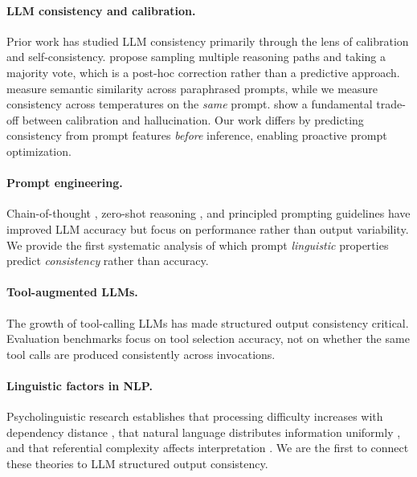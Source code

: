 \documentclass{article}
\begin{document}
\paragraph{LLM consistency and calibration.}
Prior work has studied LLM consistency primarily through the lens of calibration and self-consistency. \citet{wang2023selfconsistency} propose sampling multiple reasoning paths and taking a majority vote, which is a post-hoc correction rather than a predictive approach. \citet{raj2023semantic} measure semantic similarity across paraphrased prompts, while we measure consistency across temperatures on the \emph{same} prompt. \citet{kalai2024calibrated} show a fundamental trade-off between calibration and hallucination. Our work differs by predicting consistency from prompt features \emph{before} inference, enabling proactive prompt optimization.

\paragraph{Prompt engineering.}
Chain-of-thought \citep{wei2022chain}, zero-shot reasoning \citep{kojima2022large}, and principled prompting guidelines \citep{bsharat2024principled} have improved LLM accuracy but focus on performance rather than output variability. We provide the first systematic analysis of which prompt \emph{linguistic} properties predict \emph{consistency} rather than accuracy.

\paragraph{Tool-augmented LLMs.}
The growth of tool-calling LLMs \citep{schick2023toolformer, patil2023gorilla, qin2023toolllm} has made structured output consistency critical. Evaluation benchmarks focus on tool selection accuracy, not on whether the same tool calls are produced consistently across invocations.

\paragraph{Linguistic factors in NLP.}
Psycholinguistic research establishes that processing difficulty increases with dependency distance \citep{gibson2000dependency}, that natural language distributes information uniformly \citep{jaeger2010redundancy}, and that referential complexity affects interpretation \citep{grosz1995centering}. We are the first to connect these theories to LLM structured output consistency.
\end{document}
